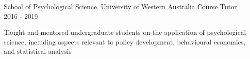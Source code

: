 \begin{cventries}
  \cventry
    {School of Psychological Science, University of Western Australia} %
    {Course Tutor} %
    {}%
    {2016 - 2019} %
    { %
      \begin{cvitems}
        \item Taught and mentored undergraduate students on the application of psychological science, including aspects relevant to policy development, behavioural economics, and statistical analysis
      \end{cvitems}
    }
    
\end{cventries}

